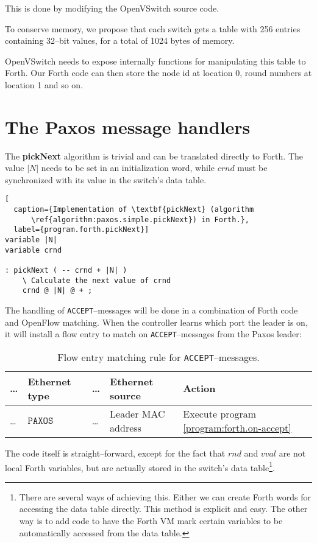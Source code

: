 This is done by modifying the OpenVSwitch source code.

To conserve memory, we propose that each switch gets a table with 256
entries containing 32--bit values, for a total of 1024 bytes of memory.

OpenVSwitch needs to expose internally functions for manipulating this table
to Forth.  Our Forth code can then store the node id at location 0, round
numbers at location 1 and so on.

\section{The Paxos message handlers}

The \textbf{pickNext} algorithm is trivial and can be translated directly to
Forth.  The value $|N|$ needs to be set in an initialization word,
while $crnd$ must be synchronized with its value in the switch's data table.

\begin{lstlisting}[
  caption={Implementation of \textbf{pickNext} (algorithm
      \ref{algorithm:paxos.simple.pickNext}) in Forth.},
  label={program.forth.pickNext}]
variable |N|
variable crnd

: pickNext ( -- crnd + |N| )
    \ Calculate the next value of crnd
    crnd @ |N| @ + ;
\end{lstlisting}

The handling of \texttt{ACCEPT}--messages will be done in a combination of
Forth code and OpenFlow matching.  When the controller learns which port the
leader is on, it will install a flow entry to match on
\texttt{ACCEPT}--messages from the Paxos leader:

\begin{table}[H]
  \centering
  \begin{tabular}{l|l|l|l|l|}
    \hline
      \dots &
      \textbf{Ethernet type} &
      \dots &
      \textbf{Ethernet source} &
      \textbf{Action}
      \\
    \hline
      \dots &
      $\texttt{PAXOS ACCEPT}$
      & \dots
      & Leader MAC address
      & Execute program \ref{program:forth.on-accept}
      \\
    \hline
  \end{tabular}
  \caption{Flow entry matching rule for \texttt{ACCEPT}--messages.}
  \label{table:matching.simple.accept}
\end{table}

The code itself is straight--forward, except for the fact that $rnd$ and
$vval$ are not local Forth variables, but are actually stored in the
switch's data table\footnote{There are several ways of achieving this.
Either we can create Forth words for accessing the data table directly.
This method is explicit and easy.  The other way is to add code to have
the Forth VM mark certain variables to be automatically accessed from the
data table.}.

